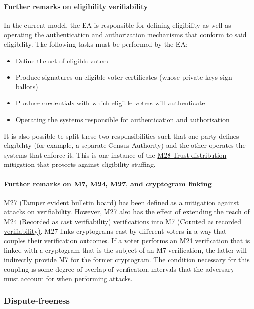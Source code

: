 \documentclass[10pt,letterpaper]{article}
\begin{document}
\paragraph{Further remarks on eligibility verifiability}

In the current model, the EA is responsible for defining eligibility as well as operating the authentication and authorization mechanisms that conform to said eligibility. The following tasks must be performed by the EA:

\begin{itemize}
    \item Define the set of eligible voters
    \item Produce signatures on eligible voter certificates (whose private keys sign ballots)
    \item Produce credentials with which eligible voters will authenticate
    \item Operating the systems responsible for authentication and authorization
\end{itemize}

It is also possible to split these two responsibilities such that one party defines eligibility (for example, a separate Census Authority) and the other operates the systems that enforce it. This is one instance of the \hyperlink{M28}{M28 Trust distribution} mitigation that protects against eligibility stuffing.

\paragraph{Further remarks on M7, M24, M27, and cryptogram linking}

\hyperlink{M27}{M27 (Tamper evident bulletin board)} has been defined as a mitigation against attacks on verifiability. However, M27 also has the effect of extending the reach of \hyperlink{M24}{M24 (Recorded as cast verifiability)} verifications into \hyperlink{M7}{M7 (Counted as recorded verifiability)}. M27 links cryptograms cast by different voters in a way that couples their verification outcomes. If a voter performs an M24 verification that is linked with a cryptogram that is the subject of an M7 verification, the latter will indirectly provide M7 for the former cryptogram. The condition necessary for this coupling is some degree of overlap of verification intervals that the adversary must account for when performing attacks.

\subsubsection{Dispute-freeness}
\end{document}
